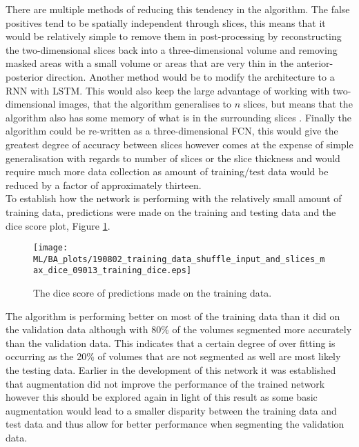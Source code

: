 There are multiple methods of reducing this tendency in the algorithm. The false positives tend to be spatially independent through slices, this means that it would be relatively simple to remove them in post-processing by reconstructing the two-dimensional slices back into a three-dimensional volume and removing masked areas with a small volume or areas that are very thin in the anterior-posterior direction. Another method would be to modify the architecture to a \ac{RNN} with \ac{LSTM}. This would also keep the large advantage of working with two-dimensional images, that the algorithm generalises to $n$ slices, but means that the algorithm also has some memory of what is in the surrounding slices \cite{chen_combining_2016, stollenga_parallel_2015}. Finally the algorithm could be re-written as a three-dimensional \ac{FCN}, this would give the greatest degree of accuracy between slices however comes at the expense of simple generalisation with regards to number of slices or the slice thickness and would require much more data collection as amount of training/test data would be reduced by a factor of approximately thirteen.\\

To establish how the network is performing with the relatively small amount of training data, predictions were made on the training and testing data and the dice score plot, Figure \ref{fig:ml_training_dice}.

\begin{figure}[H]
	\centering
	\texttt{[image: ML/BA\_plots/190802\_training\_data\_shuffle\_input\_and\_slices\_max\_dice\_09013\_training\_dice.eps]}
	\caption{The dice score of predictions made on the training data.}
	\label{fig:ml_training_dice}
\end{figure}

The algorithm is performing better on most of the training data than it did on the validation data although with 80\% of the volumes segmented more accurately than the validation data. This indicates that a certain degree of over fitting is occurring as the 20\% of volumes that are not segmented as well are most likely the testing data. Earlier in the development of this network it was established that augmentation did not improve the performance of the trained network however this should be explored again in light of this result as some basic augmentation would lead to a smaller disparity between the training data and test data and thus allow for better performance when segmenting the validation data.\\

